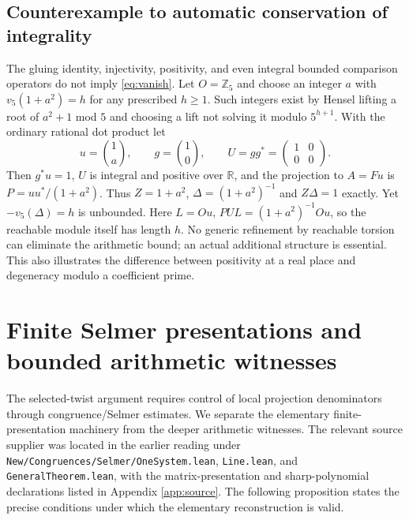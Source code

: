 \documentclass[11pt,a4paper]{article}
\begin{document}
\subsection{Counterexample to automatic conservation of integrality}
The gluing identity, injectivity, positivity, and even integral bounded comparison operators do not imply \eqref{eq:vanish}. Let $O=\mathbb Z_5$ and choose an integer $a$ with $v_5(1+a^2)=h$ for any prescribed $h\geq1$. Such integers exist by Hensel lifting a root of $a^2+1$ mod $5$ and choosing a lift not solving it modulo $5^{h+1}$. With the ordinary rational dot product let
\[
u=\binom{1}{a},\qquad g=\binom{1}{0},\qquad U=gg^*=\begin{pmatrix}1&0\\0&0\end{pmatrix}.
\]
Then $g^*u=1$, $U$ is integral and positive over $\mathbb R$, and the projection to $A=F u$ is $P=uu^*/(1+a^2)$. Thus $Z=1+a^2$, $\Delta=(1+a^2)^{-1}$ and $Z\Delta=1$ exactly. Yet $-v_5(\Delta)=h$ is unbounded. Here $L=Ou$, $PUL=(1+a^2)^{-1}Ou$, so the reachable module itself has length $h$. No generic refinement by reachable torsion can eliminate the arithmetic bound; an actual additional structure is essential. This also illustrates the difference between positivity at a real place and degeneracy modulo a coefficient prime.

\section{Finite Selmer presentations and bounded arithmetic witnesses}\label{sec:selmer}
The selected-twist argument requires control of local projection denominators through congruence/Selmer estimates. We separate the elementary finite-presentation machinery from the deeper arithmetic witnesses. The relevant source supplier was located in the earlier reading under \texttt{New/\allowbreak Congruences/\allowbreak Selmer/\allowbreak OneSystem.lean}, \texttt{Line.lean}, and \texttt{GeneralTheorem.lean}, with the matrix-presentation and sharp-polynomial declarations listed in Appendix \ref{app:source}. The following proposition states the precise conditions under which the elementary reconstruction is valid.
\end{document}
